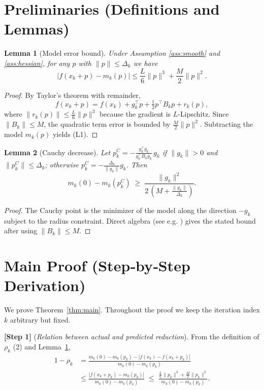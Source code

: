 \documentclass{article}
\newtheorem{lemma}{Lemma}
\begin{document}
\newpage
\section*{Preliminaries (Definitions and Lemmas)}
\begin{lemma}[Model error bound]\label{lem:modelerror}
Under Assumption \ref{ass:smooth} and \ref{ass:hessian},
for any \(p\) with \(\|p\|\le\Delta_{k}\) we have
\[
\bigl|f(x_{k}+p)-m_{k}(p)\bigr|
\le \frac{L}{6}\|p\|^{3}+\frac{M}{2}\|p\|^{2}.
\tag{L1}
\]
\end{lemma}
\begin{proof}
By Taylor’s theorem with remainder,
\[
f(x_{k}+p)=f(x_{k})+g_{k}^{\top}p+\tfrac12 p^{\top}B_{k}p+r_{k}(p),
\]
where \(\|r_{k}(p)\|\le \frac{L}{6}\|p\|^{3}\) because the gradient is \(L\)‑Lipschitz.
Since \(\|B_{k}\|\le M\), the quadratic term error is bounded by \(\frac{M}{2}\|p\|^{2}\).
Subtracting the model \(m_{k}(p)\) yields (L1). \qedhere
\end{proof}

\begin{lemma}[Cauchy decrease]\label{lem:cauchy}
Let \(p_{k}^{C}= -\frac{g_{k}^{\top}g_{k}}{g_{k}^{\top}B_{k}g_{k}}\,g_{k}\) if
\(\|g_{k}\|>0\) and \(\|p_{k}^{C}\|\le\Delta_{k}\); otherwise
\(p_{k}^{C}= -\frac{\Delta_{k}}{\|g_{k}\|}g_{k}\).  Then
\[
m_{k}(0)-m_{k}(p_{k}^{C})\;\ge\;
\frac{\|g_{k}\|^{2}}{2\,(M+\frac{\|g_{k}\|}{\Delta_{k}})}.
\tag{L2}
\]
\end{lemma}
\begin{proof}
The Cauchy point is the minimizer of the model along the direction \(-g_{k}\)
subject to the radius constraint.  Direct algebra (see e.g. \cite{conn1999})
gives the stated bound after using \(\|B_{k}\|\le M\). \qedhere
\end{proof}

\section*{Main Proof (Step‑by‑Step Derivation)}
We prove Theorem~\ref{thm:main}.  Throughout the proof we keep the
iteration index \(k\) arbitrary but fixed.

\medskip
\noindent\textbf{[Step 1]} (\emph{Relation between actual and predicted reduction}).  
From the definition of \(\rho_{k}\) (2) and Lemma~\ref{lem:modelerror},
\[
\begin{aligned}
1-\rho_{k}
&= \frac{m_{k}(0)-m_{k}(p_{k})-\bigl[f(x_{k})-f(x_{k}+p_{k})\bigr]}
        {m_{k}(0)-m_{k}(p_{k})}\\[4pt]
&\le \frac{|f(x_{k}+p_{k})-m_{k}(p_{k})|}
           {m_{k}(0)-m_{k}(p_{k})}
 \;\le\;
 \frac{\frac{L}{6}\|p_{k}\|^{3}+\frac{M}{2}\|p_{k}\|^{2}}
      {m_{k}(0)-m_{k}(p_{k})}.      \tag{S1}
\end{aligned}
\]
\end{document}
